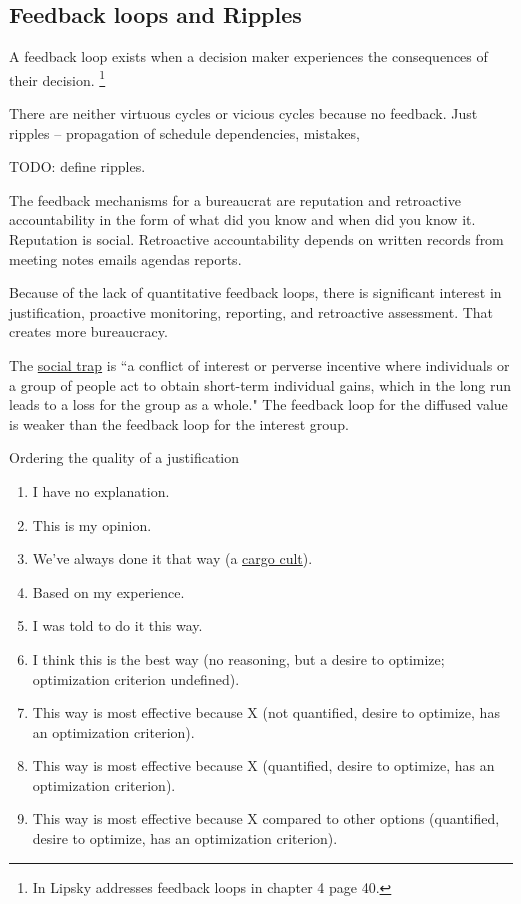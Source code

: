 \subsection{Feedback loops and Ripples\label{sec:feedback-loop-and-ripples}}

A feedback loop exists when a decision maker experiences the consequences of their decision.
\footnote{In \cite{1983_Lipsky} Lipsky addresses feedback loops in chapter 4 page 40.}


There are neither virtuous cycles or vicious cycles because no feedback. Just ripples -- propagation of schedule dependencies, mistakes,

TODO: define ripples.

The feedback mechanisms for a bureaucrat are reputation and retroactive accountability in the form of what did you know and when did you know it.
Reputation is social.
Retroactive accountability depends on written records from meeting notes emails agendas reports.


Because of the lack of quantitative feedback loops, there is significant interest in justification, proactive monitoring, reporting, and retroactive assessment. That creates more bureaucracy.


The \href{https://en.wikipedia.org/wiki/Social_trap}{social trap} is ``a conflict of interest or perverse incentive where individuals or a group of people act to obtain short-term individual gains, which in the long run leads to a loss for the group as a whole."
The feedback loop for the diffused value is weaker than the feedback loop for the interest group. 


Ordering the quality of a justification
\begin{enumerate}
    \item I have no explanation.
    \item This is my opinion.
    \item We've always done it that way (a \href{https://en.wikipedia.org/wiki/Cargo_cult}{cargo cult}).
    \item Based on my experience.
    \item I was told to do it this way.
    \item I think this is the best way (no reasoning, but a desire to optimize; optimization criterion undefined).
    \item This way is most effective because X (not quantified, desire to optimize, has an optimization criterion).
    \item This way is most effective because X (quantified, desire to optimize, has an optimization criterion).
    \item This way is most effective because X compared to other options (quantified, desire to optimize, has an optimization criterion).
\end{enumerate}


